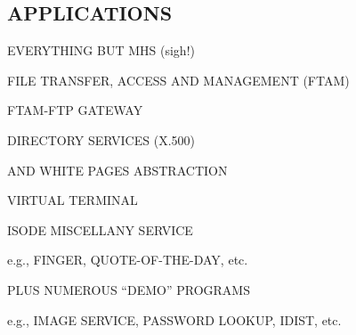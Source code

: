 \begin{bwslide}
\part*	{APPLICATIONS}\bf

\begin{nrtc}
\item	EVERYTHING BUT MHS (sigh!)
\end{nrtc}
\end{bwslide}


\begin{bwslide}

\begin{nrtc}
\item	FILE TRANSFER, ACCESS AND MANAGEMENT (FTAM)

\item	FTAM-FTP GATEWAY

\item	DIRECTORY SERVICES (X.500)
    \begin{nrtc}
    \item	AND WHITE PAGES ABSTRACTION
    \end{nrtc}

\item	VIRTUAL TERMINAL

\item	ISODE MISCELLANY SERVICE
    \begin{nrtc}
    \item	e.g., FINGER, QUOTE-OF-THE-DAY, etc.
    \end{nrtc}

\item	PLUS NUMEROUS ``DEMO'' PROGRAMS
    \begin{nrtc}
    \item	e.g., IMAGE SERVICE, PASSWORD LOOKUP, IDIST, etc.
    \end{nrtc}
\end{nrtc}
\end{bwslide}



